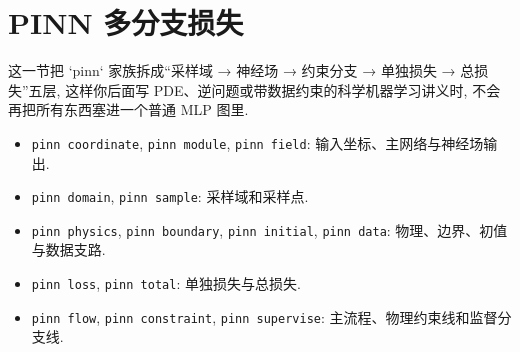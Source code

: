 \documentclass[a4paper,12pt,oneside]{maki-notes}
\begin{document}
\section{PINN 多分支损失}

这一节把 `pinn` 家族拆成“采样域 → 神经场 → 约束分支 → 单独损失 → 总损失”五层, 这样你后面写 PDE、逆问题或带数据约束的科学机器学习讲义时, 不会再把所有东西塞进一个普通 MLP 图里.

\begin{styleinventory}
\begin{itemize}
\item \texttt{pinn coordinate}, \texttt{pinn module}, \texttt{pinn field}: 输入坐标、主网络与神经场输出.
\item \texttt{pinn domain}, \texttt{pinn sample}: 采样域和采样点.
\item \texttt{pinn physics}, \texttt{pinn boundary}, \texttt{pinn initial}, \texttt{pinn data}: 物理、边界、初值与数据支路.
\item \texttt{pinn loss}, \texttt{pinn total}: 单独损失与总损失.
\item \texttt{pinn flow}, \texttt{pinn constraint}, \texttt{pinn supervise}: 主流程、物理约束线和监督分支线.
\end{itemize}
\end{styleinventory}
\end{document}
